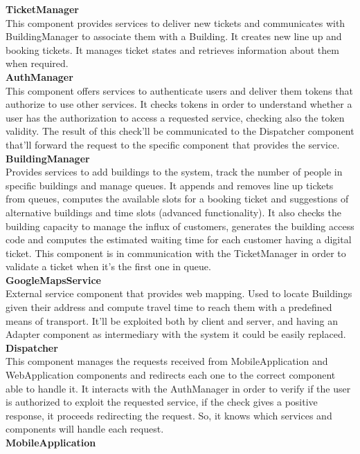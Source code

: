 \textbf{TicketManager}\\
This component provides services to deliver new tickets and communicates with BuildingManager to associate them with a Building. It creates new line up and booking tickets. It manages ticket states and retrieves information about them when required.\\
\textbf{AuthManager}\\
This component offers services to authenticate users and deliver them tokens that authorize to use other services. It checks tokens in order to understand whether a user has the authorization to access a requested service, checking also the token validity. The result of this check'll be communicated to the Dispatcher component that'll forward the request to the specific component that provides the service.\\
\textbf{BuildingManager}\\
Provides services to add buildings to the system, track the number of people in specific buildings and manage queues. It appends and removes line up tickets from queues, computes the available slots for a booking ticket and suggestions of alternative buildings and time slots (advanced functionality). It also checks the building capacity to manage the influx of customers, generates the building access code and computes the estimated waiting time for each customer having a digital ticket. This component is in communication with the TicketManager  in order to validate a ticket when it's the first one in queue.\\
\textbf{GoogleMapsService}\\
External service component that provides web mapping. Used to locate Buildings given their address and compute travel time to reach them with a predefined means of transport. It'll be exploited both by client and server, and having an Adapter component as intermediary with the system it could be easily replaced.\\
\textbf{Dispatcher}\\
This component manages the requests received from MobileApplication and WebApplication components and redirects each one to the correct component able to handle it. It interacts with the AuthManager in order to verify if the user is authorized to exploit the requested service, if the check gives a positive response, it proceeds redirecting the request. So, it knows which services and components will handle each request.\\
\textbf{MobileApplication}\\
